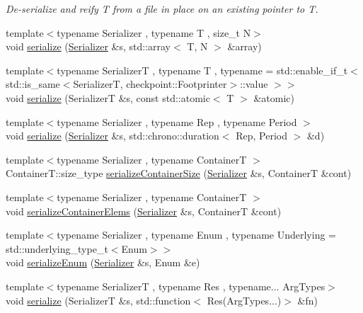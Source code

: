 \begin{DoxyCompactItemize}
\begin{DoxyCompactList}\small\item\em De-\/serialize and reify {\ttfamily T} from a file in place on an existing pointer to {\ttfamily T}. \end{DoxyCompactList}\item 
{\footnotesize template$<$typename Serializer , typename T , size\+\_\+t N$>$ }\\void \hyperlink{namespacecheckpoint_a976e83bf5f22b7bfc5036fd829be039e}{serialize} (\hyperlink{structcheckpoint_1_1_serializer}{Serializer} \&s, std\+::array$<$ T, N $>$ \&array)
\item 
{\footnotesize template$<$typename SerializerT , typename T , typename  = std\+::enable\+\_\+if\+\_\+t$<$    std\+::is\+\_\+same$<$\+Serializer\+T, checkpoint\+::\+Footprinter$>$\+::value  $>$$>$ }\\void \hyperlink{namespacecheckpoint_a40ca9a5c99807bd8a0610098d94b5125}{serialize} (SerializerT \&s, const std\+::atomic$<$ T $>$ \&atomic)
\item 
{\footnotesize template$<$typename Serializer , typename Rep , typename Period $>$ }\\void \hyperlink{namespacecheckpoint_aec244476371c452d9d9318b9d5b24401}{serialize} (\hyperlink{structcheckpoint_1_1_serializer}{Serializer} \&s, std\+::chrono\+::duration$<$ Rep, Period $>$ \&d)
\item 
{\footnotesize template$<$typename Serializer , typename ContainerT $>$ }\\Container\+T\+::size\+\_\+type \hyperlink{namespacecheckpoint_a3359595d5a4c6fcf5fc95069c71f869b}{serialize\+Container\+Size} (\hyperlink{structcheckpoint_1_1_serializer}{Serializer} \&s, ContainerT \&cont)
\item 
{\footnotesize template$<$typename Serializer , typename ContainerT $>$ }\\void \hyperlink{namespacecheckpoint_a9c880ba9bb9a106e784e06554b2fbcf2}{serialize\+Container\+Elems} (\hyperlink{structcheckpoint_1_1_serializer}{Serializer} \&s, ContainerT \&cont)
\item 
{\footnotesize template$<$typename Serializer , typename Enum , typename Underlying  = std\+::underlying\+\_\+type\+\_\+t$<$\+Enum$>$$>$ }\\void \hyperlink{namespacecheckpoint_a5f368cb543eec78bb608a68fe2401562}{serialize\+Enum} (\hyperlink{structcheckpoint_1_1_serializer}{Serializer} \&s, Enum \&e)
\item 
{\footnotesize template$<$typename SerializerT , typename Res , typename... Arg\+Types$>$ }\\void \hyperlink{namespacecheckpoint_ad3043fe034b7bf1d0d864e1e819c84d4}{serialize} (SerializerT \&s, std\+::function$<$ Res(Arg\+Types...)$>$ \&fn)

\end{DoxyCompactItemize}
